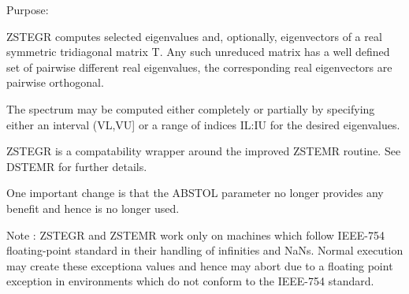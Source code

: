  \begin{DoxyParagraph}{Purpose\+: }
\begin{DoxyVerb} ZSTEGR computes selected eigenvalues and, optionally, eigenvectors
 of a real symmetric tridiagonal matrix T. Any such unreduced matrix has
 a well defined set of pairwise different real eigenvalues, the corresponding
 real eigenvectors are pairwise orthogonal.

 The spectrum may be computed either completely or partially by specifying
 either an interval (VL,VU] or a range of indices IL:IU for the desired
 eigenvalues.

 ZSTEGR is a compatability wrapper around the improved ZSTEMR routine.
 See DSTEMR for further details.

 One important change is that the ABSTOL parameter no longer provides any
 benefit and hence is no longer used.

 Note : ZSTEGR and ZSTEMR work only on machines which follow
 IEEE-754 floating-point standard in their handling of infinities and
 NaNs.  Normal execution may create these exceptiona values and hence
 may abort due to a floating point exception in environments which
 do not conform to the IEEE-754 standard.\end{DoxyVerb}
 
\end{DoxyParagraph}

